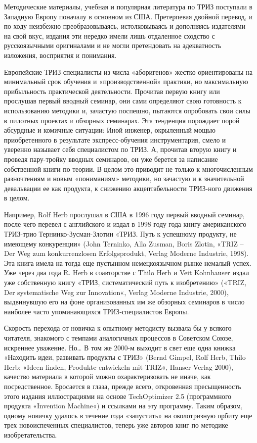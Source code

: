 \documentclass[11pt,a4paper]{article}
\begin{document}
Методические материалы, учебная и популярная литература по ТРИЗ поступали в
Западную Европу поначалу в основном из США. Претерпевая двойной перевод, и по
ходу неизбежно преобразовываясь, истолковываясь и дополняясь издателями на
свой вкус, издания эти нередко имели лишь отдаленное сходство с русскоязычными
оригиналами и не могли претендовать на адекватность изложения, восприятия и
понимания.

Европейские ТРИЗ-специалисты из числа «аборигенов» жестко ориентированы на
минимальный срок обучения и «производственной» практики, но максимальную
прибыльность практической деятельности. Прочитав первую книгу или прослушав
первый вводный семинар, они сами определяют свою готовность к использованию
методики и, зачастую поспешно, пытаются опробовать свои силы в пилотных
проектах и обзорных семинарах. Эта тенденция порождает порой абсурдные и
комичные ситуации: Иной инженер, окрыленный мощью приобретенного в результате
экспресс-обучения инструментария, смело и уверенно называет себя специалистом
по ТРИЗ. А, прочитав вторую книгу и проведя пару-тройку вводных семинаров, он
уже берется за написание собственной книги по теории. В целом это приводит не
только к многочисленным разночтениям и новым «пониманиям» методики, но
зачастую и к значительной девальвации ее как продукта, к снижению
акцептабельности ТРИЗ-ного движения в целом.

Например, Rolf Herb прослушал в США в 1996 году первый вводный семинар, после
чего перевел с английского и издал в 1998 году года книгу американского
ТРИЗ-трио Тернинко-Зусман-Злотин «ТРИЗ. Путь к успешному продукту, не имеющему
конкуренции» (John Terninko, Alla Zusman, Boris Zlotin, «TRIZ -- Der Weg zum
konkurrenzlosen Erfolgsprodukt, Verlag Moderne Industrie, 1998). Эта книга
имела на тогда еще пустынном немецкоязычном рынке немалый успех. Уже через два
года R. Herb в соавторстве с Thilo Herb и Veit Kohnhauser издал уже
собственную книгу «ТРИЗ, систематический путь к изобретению» («TRIZ, Der
systematische Weg zur Innovation«, Verlag Moderne Industrie, 2000),
выдвинувшую его на фоне организованных им же обзорных семинаров в число
наиболее часто упоминающихся ТРИЗ-специалистов Европы.

Скорость перехода от новичка к опытному методисту вызвала бы у всякого
читателя, знакомого с темпами аналогичных процессов в Советском Союзе,
искреннее уважение. Но… В том же 2000-м выходит в свет еще одна книжка
«Находить идеи, развивать продукты с ТРИЗ» (Bernd Gimpel, Rolf Herb, Thilo
Herb: «Ideen finden, Produkte entwickeln mit TRIZ«, Hanser Verlag 2000),
качество материала в которой можно охарактеризовать не иначе, как
посредственное. Бросается в глаза, прежде всего, откровенная пресыщенность
этого издания иллюстрациями на основе TechOptimizer 2.5 (программного продукта
«Invention Machine«) и ссылками на эту программу. Таким образом, одному
новичку удалось в течение года «запустить» на околотризную орбиту еще трех
новоиспеченных специалистов, теперь уже авторов книг по методике
изобретательства.
\end{document}
